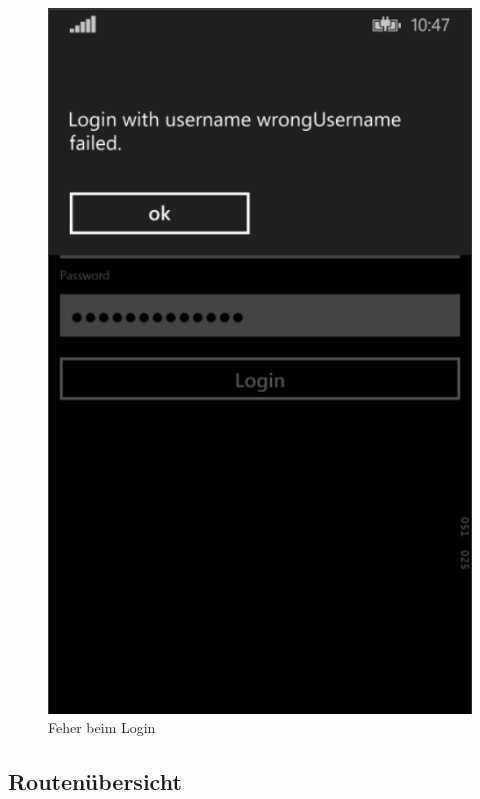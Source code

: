 \documentclass[a4paper,ngerman]{scrartcl}
\begin{document}
\begin{figure}[h]
\centering
\includegraphics[width=.95\textwidth]{images/loginPage_Failed}
\caption{Feher beim Login}
\end{figure}

\subsection{Routenübersicht}
\end{document}
